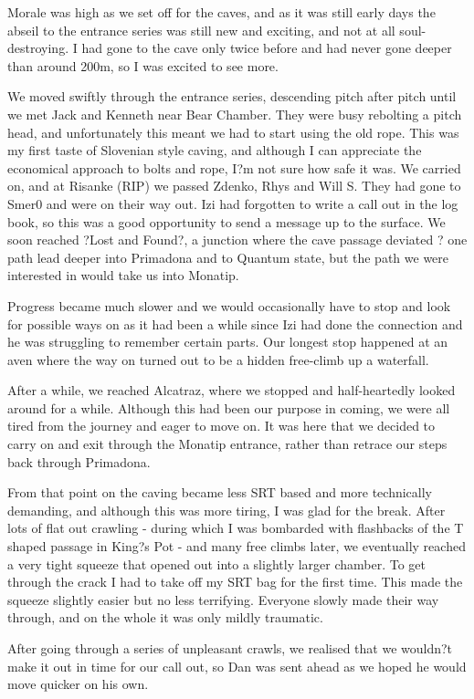\documentclass[onecolumn]{book}
\begin{document}
Morale was high as we set off for the caves, and as it was still early days the abseil to the entrance series was still new and exciting, and not at all soul-destroying. I had gone to the cave only twice before and had never gone deeper than around 200m, so I was excited to see more.

We moved swiftly through the entrance series, descending pitch after pitch until we met Jack and Kenneth near Bear Chamber. They were busy rebolting a pitch head, and unfortunately this meant we had to start using the old rope. This was my first taste of Slovenian style caving, and although I can appreciate the economical approach to bolts and rope, I?m not sure how safe it was. We carried on, and at Risanke (RIP) we passed Zdenko, Rhys and Will S. They had gone to Smer0 and were on their way out. Izi had forgotten to write a call out in the log book, so this was a good opportunity to send a message up to the surface. We soon reached ?Lost and Found?, a junction where the cave passage deviated ? one path lead deeper into Primadona and to Quantum state, but the path we were interested in would take us into Monatip. 

Progress became much slower and we would occasionally have to stop and look for possible ways on as it had been a while since Izi had done the connection and he was struggling to remember certain parts. Our longest stop happened at an aven where the way on turned out to be a hidden free-climb up a waterfall.

After a while, we reached Alcatraz, where we stopped and half-heartedly looked around for a while. Although this had been our purpose in coming, we were all tired from the journey and eager to move on. It was here that we decided to carry on and exit through the Monatip entrance, rather than retrace our steps back through Primadona. 

From that point on the caving became less SRT based and more technically demanding, and although this was more tiring, I was glad for the break. After lots of flat out crawling - during which I was bombarded with flashbacks of the T shaped passage in King?s Pot - and many free climbs later, we eventually reached a very tight squeeze that opened out into a slightly larger chamber. To get through the crack I had to take off my SRT bag for the first time. This made the squeeze slightly easier but no less terrifying. Everyone slowly made their way through, and on the whole it was only mildly traumatic.

After going through a series of unpleasant crawls, we realised that we wouldn?t make it out in time for our call out, so Dan was sent ahead as we hoped he would move quicker on his own.
\end{document}
